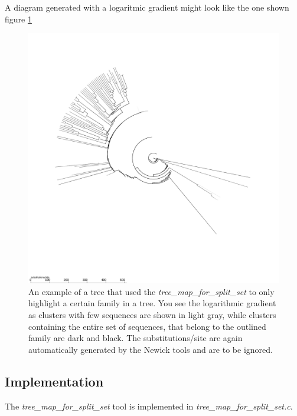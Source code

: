 A diagram generated with a logaritmic gradient might look like the one
shown figure \ref{fig-treemapset}

\begin{figure}
  \includegraphics[scale=0.6]{tree-clust.pdf}
  \caption{An example of a tree that used the
    \emph{tree\_map\_for\_split\_set} to only highlight a certain
    family in a tree. You see the logarithmic gradient as clusters
    with few sequences are shown in light gray, while clusters
    containing the entire set of sequences, that belong to the
    outlined family are dark and black. The substitutions/site are
    again automatically generated by the Newick tools
    \cite{newick_tools} and are to be ignored.}
  \label{fig-treemapset}
\end{figure}

\subsection{Implementation}
The \emph{tree\_map\_for\_split\_set} tool is implemented in \newline
\emph{tree\_map\_for\_split\_set.c}.



        
